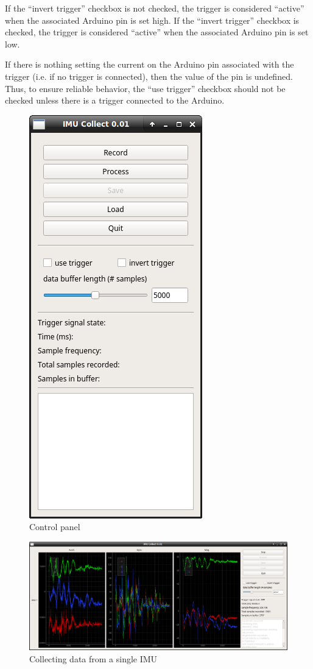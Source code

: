 \documentclass[11pt,letterpaper,article,oneside]{memoir}
\begin{document}
If the ``invert trigger'' checkbox is not checked, the trigger is considered
``active'' when the associated Arduino pin is set high. If the ``invert
trigger'' checkbox is checked, the trigger is considered ``active'' when the
associated Arduino pin is set low.

If there is nothing setting the current on the Arduino pin associated with the
trigger (i.e. if no trigger is connected), then the value of the pin is
undefined.  Thus, to ensure reliable behavior, the ``use trigger'' checkbox
should not be checked unless there is a trigger connected to the Arduino.

\begin{figure}[]
    \begin{center}
        \includegraphics[width=.45\textwidth]{screenshot_0_imu}
    \end{center}
    \caption{Control panel} 
\end{figure}

\begin{figure}[]
    \begin{center}
        \includegraphics[width=.45\textwidth]{screenshot_1_imu}
    \end{center}
    \caption{Collecting data from a single IMU} 
\end{figure}
\end{document}
